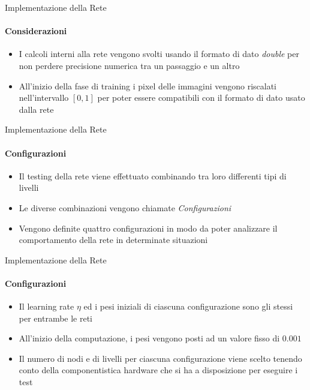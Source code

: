 \documentclass[
 ]{beamer}
\begin{document}
\begin{frame}{Implementazione della Rete}
    \framesubtitle{Considerazioni}
    \begin{itemize} [<+->]
        \setlength\itemsep{1.5em}
        \item \large I calcoli interni alla rete vengono svolti usando il formato di dato \emph{double} per non perdere precisione numerica tra un passaggio e un altro
        \item \large All'inizio della fase di training i pixel delle immagini vengono riscalati nell'intervallo $[0,1]$ per poter essere compatibili con il formato di dato usato dalla rete 
    \end{itemize} 
    
\end{frame}

\begin{frame}{Implementazione della Rete}
    \framesubtitle{Configurazioni}
    \smallskip
    \begin{itemize} [<+->]
        \setlength\itemsep{2em}
        \item \large Il testing della rete viene effettuato combinando tra loro differenti tipi di livelli
        \item \large Le diverse combinazioni vengono chiamate \emph{Configurazioni}
        \item \large Vengono definite quattro configurazioni in modo da poter analizzare il comportamento della rete in determinate situazioni
    \end{itemize}     
\end{frame}

\begin{frame}{Implementazione della Rete}
    \framesubtitle{Configurazioni}
    \smallskip
    \begin{itemize} [<+->]
        \setlength\itemsep{2em}
        \item \large Il learning rate $\eta$ ed i pesi iniziali di ciascuna configurazione sono gli stessi per entrambe le reti 
        \item \large All'inizio della computazione, i pesi vengono posti ad un valore fisso di $0.001$ 
        \item \large Il numero di nodi e di livelli per ciascuna configurazione viene scelto tenendo conto della componentistica hardware che si ha a disposizione per eseguire i test
    \end{itemize}     
\end{frame}
\end{document}
